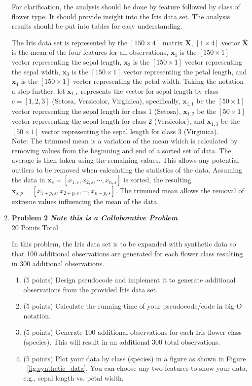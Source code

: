 \documentclass{article}
\begin{document}
\begin{enumerate}
For clarification, the analysis should be done by feature followed by class of flower type. It should provide insight into the Iris data set. The analysis results should be put into tables for easy understanding. 

The Iris data set is represented by the $[150\times4]$ matrix $\textbf{X}$, $[1\times4]$ vector $\bar{\textbf{X}}$ is the mean of the four features for all observations, $\textbf{x}_1$ is the $[150\times1]$ vector representing the sepal length, $\textbf{x}_2$ is the $[150\times1]$ vector representing the sepal width, $\textbf{x}_3$ is the $[150\times1]$ vector representing the petal length, and $\textbf{x}_4$ is the $[150\times1]$ vector representing the petal width. Taking the notation a step further, let $\textbf{x}_{1,c}$ represents the vector for sepal length by class $c = [1,2,3]$ (Setosa, Versicolor, Virginica), specifically,  $\textbf{x}_{1,1}$ be the $[50\times1]$ vector representing the sepal length for class 1 (Setosa), $\textbf{x}_{1,2}$ be the $[50\times1]$ vector representing the sepal length for class 2 (Versicolor), and $\textbf{x}_{1,3}$ be the $[50\times1]$ vector representing the sepal length for class 3 (Virginica).\\
		
    Note: The trimmed mean is a variation of the mean which is calculated by removing values from the beginning and end of a sorted set of data. The average is then taken using the remaining values. This allows any potential outliers to be removed when calculating the statistics of the data. Assuming the data in $\textbf{x}_s = [x_{1,s}, x_{2,s}, \cdots, x_{n,s} ]$ is sorted, the resulting $\textbf{x}_{s,p} =  [x_{1+p,s}, x_{2+p,s}, \cdots, x_{n-p,s} ]$. The trimmed mean allows the removal of extreme values influencing the mean of the data. \\

\pagebreak

    \item \textbf{Problem 2 } \textbf{\emph{Note this is a Collaborative Problem}}\\
    20 Points Total 
    
    In this problem, the Iris data set is to be expanded with synthetic data so that 100 additional observations are generated for each flower class resulting in 300 additional observations. 
    \begin{enumerate}
	\item (5 points) Design pseudocode and implement it to generate additional observations from the provided Iris data set. 
	\item (5 points) Calculate the running time of your pseudocode/code in big-O notation.  
	\item (5 points) Generate 100 additional observations for each Iris flower class (species). This will result in an additional 300 total observations.  
	\item (5 points) Plot your data by class (species) in a figure as shown in Figure ~\ref{fig:synthetic_data}. You can choose any two features to show your data, e.g., sepal length vs. petal width.  
\end{enumerate}


\end{enumerate}
\end{document}

